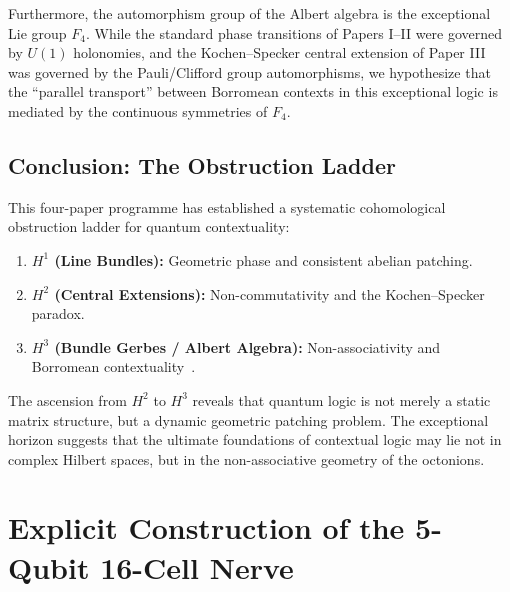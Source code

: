\documentclass[11pt]{article}
\begin{document}
Furthermore, the automorphism group of the Albert algebra is the exceptional Lie group $F_4$. While the standard phase transitions of Papers I--II were governed by $U(1)$ holonomies, and the Kochen--Specker central extension of Paper III was governed by the Pauli/Clifford group automorphisms, we hypothesize that the ``parallel transport'' between Borromean contexts in this exceptional logic is mediated by the continuous symmetries of $F_4$.

\subsection{Conclusion: The Obstruction Ladder}

This four-paper programme has established a systematic cohomological obstruction ladder for quantum contextuality:
\begin{enumerate}
    \item \textbf{$H^1$ (Line Bundles):} Geometric phase and consistent abelian patching.
    \item \textbf{$H^2$ (Central Extensions):} Non-commutativity and the Kochen--Specker paradox.
    \item \textbf{$H^3$ (Bundle Gerbes / Albert Algebra):} Non-associativity and Borromean contextuality~\cite{Murray96,Jacobson68}.
\end{enumerate}

The ascension from $H^2$ to $H^3$ reveals that quantum logic is not merely a static matrix structure, but a dynamic geometric patching problem. The exceptional horizon suggests that the ultimate foundations of contextual logic may lie not in complex Hilbert spaces, but in the non-associative geometry of the octonions.


\appendix

\section{Explicit Construction of the 5-Qubit 16-Cell Nerve}
\label{app:16cell-operators}
\end{document}
